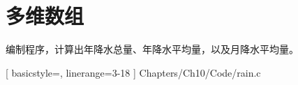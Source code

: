 \section{多维数组}

\begin{frame}[fragile]\ft{\secname} 
编制程序，计算出年降水总量、年降水平均量，以及月降水平均量。
\end{frame}

\begin{frame}[fragile]\ft{\secname} 

[
basicstyle=\footnotesize\ttfamily,
linerange={3-18}
]
{Chapters/Ch10/Code/rain.c}
\end{frame}
